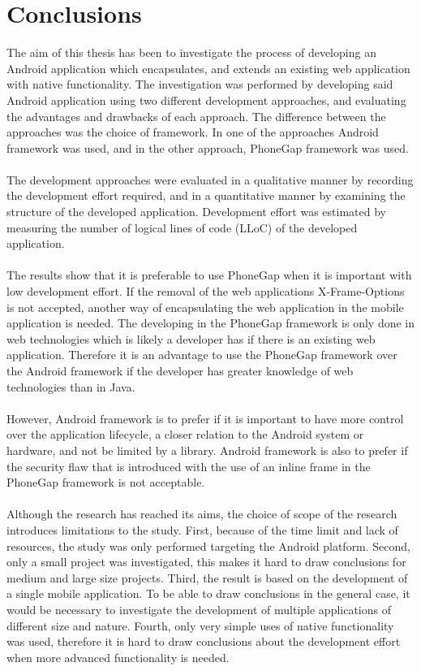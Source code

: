 \chapter{Conclusions} \label{ch:conclusions}
The aim of this thesis has been to investigate the process of developing an Android application which encapsulates, and extends an existing web application with native functionality. The investigation was performed by developing said Android application using two different development approaches, and evaluating the advantages and drawbacks of each approach. The difference between the approaches was the choice of framework. In one of the approaches Android framework was used, and in the other approach, PhoneGap framework was used.
\\\\
The development approaches were evaluated in a qualitative manner by recording the development effort required, and in a quantitative manner by examining the structure of the developed application. Development effort was estimated by measuring the number of logical lines of code (LLoC) of the developed application.
\\\\
The results show that it is preferable to use PhoneGap when it is important with low development effort. If the removal of the web applications X-Frame-Options is not accepted, another way of encapsulating the web application in the mobile application is needed. The developing in the PhoneGap framework is only done in web technologies which is likely a developer has if there is an existing web application. Therefore it is an advantage to use the PhoneGap framework over the Android framework if the developer has greater knowledge of web technologies than in Java.
\\\\
However, Android framework is to prefer if it is important to have more control over the application lifecycle, a closer relation to the Android system or hardware, and not be limited by a library. Android framework is also to prefer if the security flaw that is introduced with the use of an inline frame in the PhoneGap framework is not acceptable.
\\\\
Although the research has reached its aims, the choice of scope of the research introduces limitations to the study. First, because of the time limit and lack of resources, the study was only performed targeting the Android platform. Second, only a small project was investigated, this makes it hard to draw conclusions for medium and large size projects. Third, the result is based on the development of a single mobile application. To be able to draw conclusions in the general case, it would be necessary to investigate the development of multiple applications of different size and nature. Fourth, only very simple uses of native functionality was used, therefore it is hard to draw conclusions about the development effort when more advanced functionality is needed.
